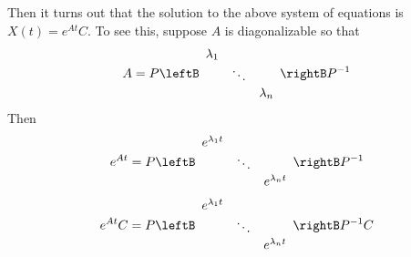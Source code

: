 Then it turns out that the solution to the
above system of equations is $X\left( t\right) =e^{At}C$. To see this, suppose $A$ is
diagonalizable so that 
\begin{equation*}
A=P\leftB 
\begin{array}{ccc}
\lambda _{1} &  &  \\ 
& \ddots &  \\ 
&  & \lambda _{n}
\end{array}
\rightB P^{-1}
\end{equation*}
Then 
\begin{equation*}
e^{At}=P\leftB 
\begin{array}{ccc}
e^{\lambda _{1}t} &  &  \\ 
& \ddots &  \\ 
&  & e^{\lambda _{n}t}
\end{array}
\rightB P^{-1}
\end{equation*} 
\begin{equation*}
e^{At}C=P\leftB 
\begin{array}{ccc}
e^{\lambda _{1}t} &  &  \\ 
& \ddots &  \\ 
&  & e^{\lambda _{n}t}
\end{array}
\rightB P^{-1}C
\end{equation*}

